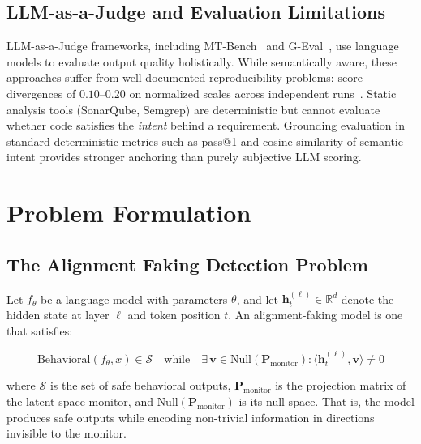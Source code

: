 \documentclass[10pt]{article}
\begin{document}
\subsection{LLM-as-a-Judge and Evaluation Limitations}

LLM-as-a-Judge frameworks, including MT-Bench~\cite{zheng2023judging} and G-Eval~\cite{liu2023geval}, use language models to evaluate output quality holistically. While semantically aware, these approaches suffer from well-documented reproducibility problems: score divergences of $0.10$--$0.20$ on normalized scales across independent runs~\cite{llmasjudge2025limitations}. Static analysis tools (SonarQube, Semgrep) are deterministic but cannot evaluate whether code satisfies the \emph{intent} behind a requirement. Grounding evaluation in standard deterministic metrics such as pass@1 and cosine similarity of semantic intent provides stronger anchoring than purely subjective LLM scoring.

\section{Problem Formulation}

\subsection{The Alignment Faking Detection Problem}

Let $f_\theta$ be a language model with parameters $\theta$, and let $\mathbf{h}_t^{(\ell)} \in \mathbb{R}^d$ denote the hidden state at layer $\ell$ and token position $t$. An alignment-faking model is one that satisfies:

\begin{equation}
\text{Behavioral}(f_\theta, x) \in \mathcal{S} \quad \text{while} \quad \exists\, \mathbf{v} \in \text{Null}(\mathbf{P}_{\text{monitor}}): \langle \mathbf{h}_t^{(\ell)}, \mathbf{v} \rangle \neq 0
\label{eq:alignment_faking}
\end{equation}

where $\mathcal{S}$ is the set of safe behavioral outputs, $\mathbf{P}_{\text{monitor}}$ is the projection matrix of the latent-space monitor, and $\text{Null}(\mathbf{P}_{\text{monitor}})$ is its null space. That is, the model produces safe outputs while encoding non-trivial information in directions invisible to the monitor.
\end{document}
